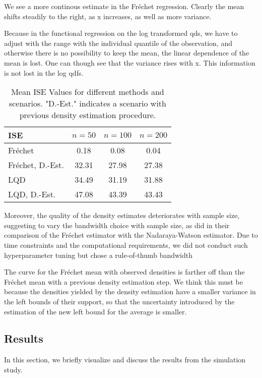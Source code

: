 We see a more continous estimate in the Fréchet regression. Clearly the mean shifts
steadily to the right, as x increases, as well as more variance.

Because in the functional regression on the log transformed qds, we have to adjust with
the range with the individual quantile of the observation, and otherwise there is no
possibility to keep the mean, the linear dependence of the mean is lost. One can though
see that the variance rises with x. This information is not lost in the log qdfs.

\begin{table}[h]
    \centering
    \begin{tabular}{lccc}
        \hline
        ISE & $n = 50$ & $n = 100$ & $n = 200$ \\
        \hline
        Fréchet             & 0.18 & 0.08 & 0.04 \\
        Fréchet, D.-Est.    & 32.31 & 27.98 & 27.38 \\
        LQD                 & 34.49 & 31.19 & 31.88 \\
        LQD, D.-Est.        & 47.08 & 43.39 & 43.43 \\
        \hline
    \end{tabular}
    \caption{Mean ISE Values for different methods and scenarios. "D.-Est." indicates
    a scenario with previous density estimation procedure.}
\end{table}

Moreover, the quality of the density estimates deteriorates with sample size, suggesting
to vary the bandwidth choice with sample size, as \textcite{PetersenMüller2019} did in
their comparison of the Fréchet estimator with the Nadaraya-Watson estimator. Due to
time constraints and the computational requirements, we did not conduct such
hyperparameter tuning but chose a rule-of-thumb bandwidth
\parencites[Chapter~3.4.1]{Silverman1986}[Chapter~2.2.1]{LiRacine2007}

The curve for the Fréchet mean with observed densities is farther off than the Fréchet
mean with a previous density estimation step. We think this must be because the densities
yielded by the density estimation have a smaller variance in the left bounds of their
support, so that the uncertainty introduced by the estimation of the new left bound for
the average is smaller.

\subsection{Results}
\label{sec:sim_results}
In this section, we briefly visualize and discuss the results from the simulation study.

